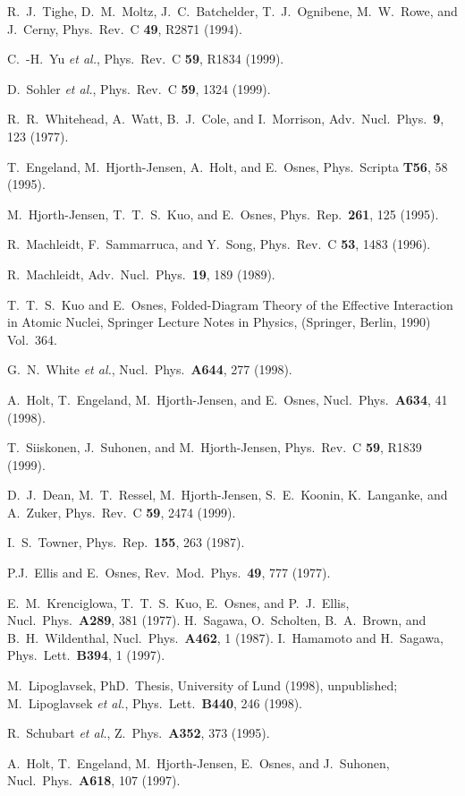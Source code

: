 \begin{multicols}{2}
\begin{references}
 R.~J.~Tighe, D.~M.~Moltz, J.~C.~Batchelder, T.~J.~Ognibene,
                M.~W.~Rowe, and J.~Cerny, Phys.~Rev.~C {\bf 49}, R2871 (1994).

 C.~-H.~Yu {\em et al.}, Phys.~Rev.~C {\bf 59}, R1834 (1999).

 D.~Sohler {\em et al.}, Phys.~Rev.~C {\bf 59}, 1324 (1999).


 R.~R.~Whitehead, A.~Watt, B.~J.~Cole, and I.~Morrison, 
                 Adv.~Nucl.~Phys.~{\bf 9}, 123 (1977).

 T.~Engeland, M.~Hjorth-Jensen, A.~Holt, and E.~Osnes,
                 Phys.~Scripta {\bf T56}, 58 (1995).

  M.~Hjorth-Jensen, T.~T.~S.~Kuo, and E.~Osnes, 
                 Phys.~Rep.~{\bf 261}, 125  (1995).

 R.~Machleidt, F.~Sammarruca, and Y.~Song,
                 Phys.~Rev.~C {\bf 53}, 1483 (1996).

  R.~Machleidt, Adv.~Nucl.~Phys.~{\bf 19}, 189 (1989). 

  T.~T.~S.~Kuo and E.~Osnes, Folded-Diagram Theory of the
Effective Interaction in Atomic Nuclei, Springer Lecture Notes in Physics,
(Springer, Berlin, 1990) Vol.~364.

 G.~N.~White {\em et al.}, 
                 Nucl.\ Phys.\ {\bf A644}, 277 (1998).

 A.~Holt, T.~Engeland, M.~Hjorth-Jensen, and E.~Osnes,
                 Nucl.~Phys.~{\bf A634}, 41 (1998).

  T.~Siiskonen, J.~Suhonen, and M.~Hjorth-Jensen, 
                 Phys.~Rev.~C {\bf 59}, R1839 (1999).

D.~J.~Dean, M.~T.~Ressel, M.~Hjorth-Jensen, S.~E.~Koonin,
                 K.~Langanke, and A.~Zuker, Phys.~Rev.~C {\bf 59}, 2474 (1999).

 I.~S.~Towner, Phys.\ Rep.\ {\bf 155}, 263 (1987).

 P.J.\ Ellis and E.\ Osnes, Rev.~Mod.~Phys.~{\bf 49}, 777 (1977).

 E.~M.\ Krenciglowa, T.~T.~S.~Kuo, E.~Osnes, and P.~J.~Ellis,
                 Nucl.~Phys.~{\bf A289}, 381 (1977).
 H.\ Sagawa, O.\ Scholten, B.\ A.\ Brown, and B.\ H.\ Wildenthal,
Nucl.\ Phys.\ {\bf A462}, 1 (1987).
 I.\ Hamamoto and H.\ Sagawa, Phys.\ Lett.\ {\bf B394}, 1 (1997).

 M.\ Lipoglavsek, PhD.\ Thesis, University of Lund (1998), unpublished;
                M.\ Lipoglavsek {\em et al.}, Phys.\ Lett.\ {\bf B440}, 246 (1998).


 R.\ Schubart {\em et al.}, Z.\ Phys.\ {\bf A352}, 373 (1995).

 A.\ Holt, T.\ Engeland, M.\ Hjorth-Jensen, E.\ Osnes, and J.\ Suhonen,
                  Nucl.\ Phys.\ {\bf A618}, 107 (1997).


\end{references}

\end{multicols}

